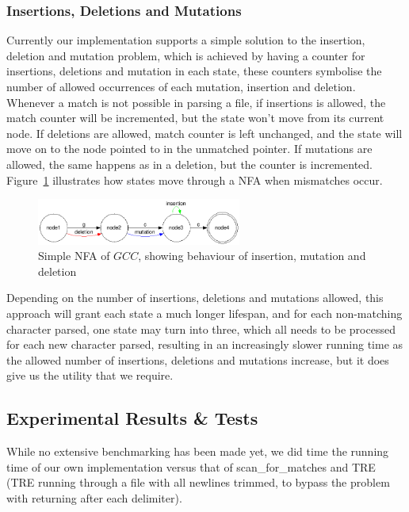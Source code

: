 \subsubsection{Insertions, Deletions and Mutations}
Currently our implementation supports a simple solution to the insertion, deletion and mutation problem, which is achieved by having a counter for insertions, deletions and mutation in each state, these counters symbolise the number of allowed occurrences of each mutation, insertion and deletion.
Whenever a match is not possible in parsing a file, if insertions is allowed, the match counter will be incremented, but the state won't move from its current node.
If deletions are allowed, match counter is left unchanged, and the state will move on to the node pointed to in the unmatched pointer.
If mutations are allowed, the same happens as in a deletion, but the counter is incremented. Figure~\ref{fig:ins_mut_del} illustrates how states move through a NFA when mismatches occur. 

\begin{figure}[h!]
  \centering
      \includegraphics[width=0.6\textwidth]{lib/gcc_ins_mut_del.png}
  \caption{Simple NFA of $GCC$, showing behaviour of insertion, mutation and deletion}
\label{fig:ins_mut_del}
\end{figure}
Depending on the number of insertions, deletions and mutations allowed, this approach will grant each state a much longer lifespan, and for each non-matching character parsed, one state may turn into three, which all needs to be processed for each new character parsed, resulting in an increasingly slower running time as the allowed number of insertions, deletions and mutations increase, but it does give us the utility that we require.
\label{state:insertion1}



\subsection{Experimental Results \& Tests} %
While no extensive benchmarking has been made yet, we did time the running time of our own implementation versus that of scan\_for\_matches and TRE (TRE running through a file with all newlines trimmed, to bypass the problem with returning after each delimiter).

